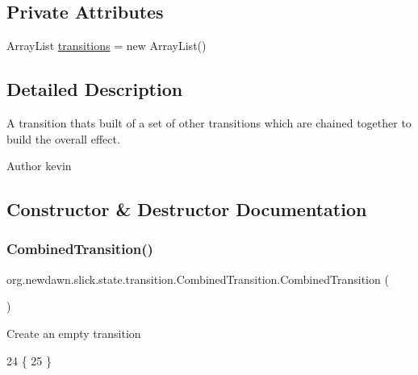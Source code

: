 \subsection*{Private Attributes}
\begin{DoxyCompactItemize}
\item 
Array\+List \mbox{\hyperlink{classorg_1_1newdawn_1_1slick_1_1state_1_1transition_1_1_combined_transition_a4fea111ea283a26351cb164e389ebbbf}{transitions}} = new Array\+List()
\end{DoxyCompactItemize}


\subsection{Detailed Description}
A transition thats built of a set of other transitions which are chained together to build the overall effect.

\begin{DoxyAuthor}{Author}
kevin 
\end{DoxyAuthor}


\subsection{Constructor \& Destructor Documentation}
\mbox{\label{classorg_1_1newdawn_1_1slick_1_1state_1_1transition_1_1_combined_transition_a511392d989e61d42152634fd7df72d23}} 
\subsubsection{\texorpdfstring{Combined\+Transition()}{CombinedTransition()}}
{\footnotesize\ttfamily org.\+newdawn.\+slick.\+state.\+transition.\+Combined\+Transition.\+Combined\+Transition (\begin{DoxyParamCaption}{ }\end{DoxyParamCaption})\hspace{0.3cm}{\ttfamily [inline]}}

Create an empty transition 
\begin{DoxyCode}
24                                 \{
25     \}
\end{DoxyCode}


